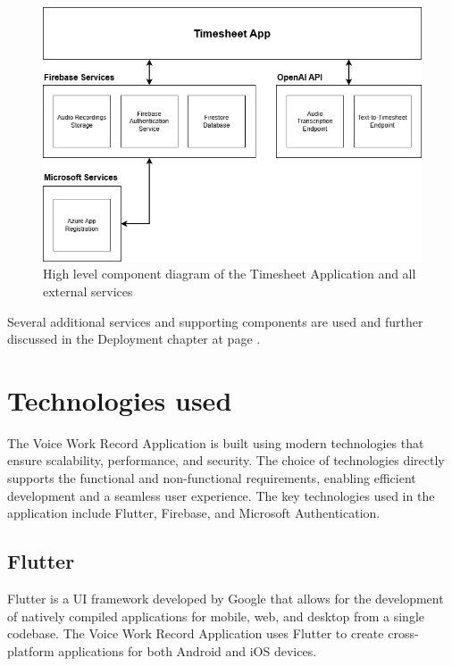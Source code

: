 \documentclass[
  digital,     %
  oneside,     %
  nosansbold,  %
  nocolorbold, %
  lof,         %
  lot,         %
]{fithesis4}
\begin{document}
\begin{figure}[ht]
    \centering
    \includegraphics[width=\textwidth]{assets/diagrams/timesheet_app_component_diagram.drawio.png}
    \caption{High level component diagram of the Timesheet Application and all external services}
    \label{fig:timesheet_app_architecture}
\end{figure}

Several additional services and supporting components are used and further discussed in the Deployment chapter at page \pageref{chap:deployment}.

\shorthandon{-}

\chapter{Technologies used}

The Voice Work Record Application is built using modern technologies that ensure scalability, performance, and security. The choice of technologies directly supports the functional and non-functional requirements, enabling efficient development and a seamless user experience. The key technologies used in the application include Flutter, Firebase, and Microsoft Authentication.

\section{Flutter}

Flutter is a UI framework developed by Google that allows for the development of natively compiled applications for mobile, web, and desktop from a single codebase. The Voice Work Record Application uses Flutter to create cross-platform applications for both Android and iOS devices.
\end{document}

